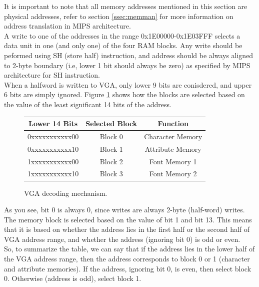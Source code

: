 \documentclass[oneside]{book}
\begin{document}
It is important to note that all memory addresses mentioned in this section
are physical addresses, refer to section \ref{ssec:memman} for more information
on address translation in MIPS architecture.\\

A write to one of the addresses in the range 0x1E00000-0x1E03FFF selects
a data unit in one (and only one) of the four RAM blocks.
Any write should be peformed using SH (store half) instruction, and
address should be always aligned to 2-byte boundary (i.e, lower 1 bit
should always be zero) as specified by MIPS architecture for SH instruction.\\

When a halfword is written to VGA, only lower 9 bits are conisdered, and
upper 6 bits are simply ignored. Figure
\ref{vgamap} shows how the blocks are selected based on the value
of the least significant 14 bits of the address.

\begin{figure}[H]
\begin{center}
\begin{tabular}{|c|c|c|}

\hline \textbf{Lower 14 Bits} & \textbf{Selected Block} & \textbf{Function} \\

\hline 0xxxxxxxxxxx00 & Block 0 & Character Memory \\
\hline 0xxxxxxxxxxx10 & Block 1 & Attribute Memory \\
\hline 1xxxxxxxxxxx00 & Block 2 & Font Memory 1 \\
\hline 1xxxxxxxxxxx10 & Block 3 & Font Memory 2 \\

\hline

\end{tabular}
\end{center}
\caption{VGA decoding mechanism.}
\label{vgamap}
\end{figure}

As you see, bit 0 is always 0, since writes are always 2-byte (half-word)
writes. The memory block is selected based on the value of bit 1 and bit 13.
This means that it is based on whether the address lies in the first half
or the second half of VGA address range, and whether the address (ignoring
bit 0) is odd or even. \\

So, to summarize the table, we can say that if the address lies in the
lower half of the VGA address range, then the address corresponds to
block 0 or 1 (character and attribute memories). If the address, ignoring
bit 0, is even, then select block 0. Otherwise (address is odd), select
block 1. \\
\end{document}
